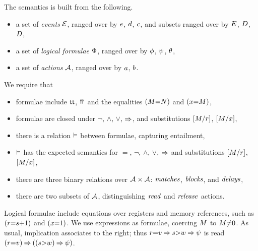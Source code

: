 The semantics is built from the following.
\begin{itemize}
\item a set of \emph{events} $\mathcal{E}$, ranged over by $e$, $d$,
  $c$, %
  and subsets ranged over by $E$, $D$, $D$,  
\item a set of \emph{logical formulae} $\Phi$, ranged over by $\phi$,
  $\psi$, $\theta$,
\item a set of \emph{actions} $\mathcal{A}$, ranged over by $a$, $b$.
\end{itemize}

We require that
\begin{itemize}
\item formulae include $\mathsf{tt}$, $\mkern.6mu\mathsf{ff}\mkern.6mu$ and the equalities $(M{=}N)$ and $(x{=}M)$,
\item formulae are closed under $\lnot$, $\land$, $\lor$, $\mathbin{\Rightarrow}$, and
  substitutions $[M/r]$, $[M/x]$,
\item there is a relation $\mathrel{\vDash}$ between
  formulae, capturing entailment, %
\item $\mathrel{\vDash}$ has the expected semantics for $=$, $\lnot$,
  $\land$, $\lor$, $\mathbin{\Rightarrow}$ and substitutions $[M/r]$, $[M/x]$,
\item there are three binary relations over $\mathcal{A}\times\mathcal{A}$:
  $\mathrel{\textnormal{\emph{matches}}}$, $\mathrel{\textnormal{\emph{blocks}}}$, and $\mathrel{\textnormal{\emph{delays}}}$,
\item there are two subsets of $\mathcal{A}$, distinguishing
  $\mathrel{\textnormal{\emph{read}}}$ and $\mathrel{\textnormal{\emph{release}}}$ actions.
\end{itemize}

Logical formulae include equations over registers and memory references, such as
$(r{=}s{+}1)$ and $(x{=}1)$.
We use expressions as formulae, coercing $M$ to $M{\neq}0$.
As usual, implication associates to the right; thus
$r{=}v\mathbin{\Rightarrow}s{>}w\mathbin{\Rightarrow}\psi$ is read
$(r{=}v)\mathbin{\Rightarrow}((s{>}w)\mathbin{\Rightarrow}\psi)$.

